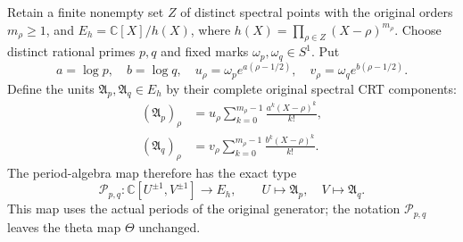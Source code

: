 Retain a finite nonempty set \(Z\) of distinct spectral points with
the original orders \(m_\rho\geq1\), and
\(E_h=\mathbb C[X]/h(X)\), where
\(h(X)=\prod_{\rho\in Z}(X-\rho)^{m_\rho}\).
Choose distinct rational primes \(p,q\) and fixed marks
\(\omega_p,\omega_q\in S^1\). Put
\[
 a=\log p,\quad b=\log q,\quad
 u_\rho=\omega_p e^{a(\rho-1/2)},\quad
 v_\rho=\omega_q e^{b(\rho-1/2)}.
\]
Define the units \(\mathfrak A_p,\mathfrak A_q\in E_h\) by their
complete original spectral CRT components:
\[
 \begin{aligned}
 (\mathfrak A_p)_\rho
   &=u_\rho\sum_{k=0}^{m_\rho-1}
               \frac{a^k(X-\rho)^k}{k!},\\
 (\mathfrak A_q)_\rho
   &=v_\rho\sum_{k=0}^{m_\rho-1}
               \frac{b^k(X-\rho)^k}{k!}.
 \end{aligned}
 \tag{P1}
\]
The period-algebra map therefore has the exact type
\[
 \mathscr P_{p,q}:\mathbb C[U^{\pm1},V^{\pm1}]
       \longrightarrow E_h,
 \qquad U\longmapsto\mathfrak A_p,\quad
 V\longmapsto\mathfrak A_q.
 \tag{P2}
\]
This map uses the actual periods of the original generator; the
notation \(\mathscr P_{p,q}\) leaves the theta map \(\Theta\) unchanged.

